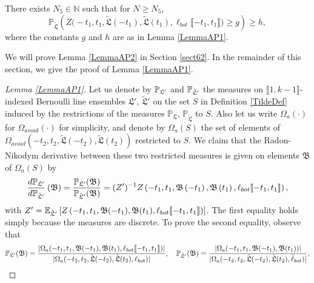 \begin{lemma}\label{LemmaAP2} There exists $N_5 \in \mathbb{N}$ such that for $N \geq N_5$,
	\begin{equation}\label{eqn57}
	\mathbb{P}_{\tilde{\mathfrak{L}}} \left( Z\big(  -t_1, t_1, \tilde{\mathfrak{L}}(-t_1) , \tilde{\mathfrak{L}}(t_1), \ell_{bot}\llbracket -t_1, t_1\rrbracket\big)\geq g    \right) \geq h,
	\end{equation}
	where the constants $g$ and $h$ are as in Lemma \ref{LemmaAP1}.
\end{lemma}
We will prove Lemma \ref{LemmaAP2} in Section \ref{sect62}. In the remainder of this section, we give the proof of Lemma \ref{LemmaAP1}.
\begin{proof}[Lemma \ref{LemmaAP1}]
	
	 Let us denote by $\mathbb{P}_{\mathfrak L'}$ and $\mathbb{P}_{\tilde{\mathfrak{L}}'}$ the measures on $\llbracket 1, k-1\rrbracket$-indexed Bernoulli line ensembles $\mathfrak{L}'$, $\tilde{\mathfrak{L}}'$ on the set $S$ in Definition \ref{TildeDef} induced by the restrictions of the measures $\mathbb{P}_{\mathfrak{L}}$, $\mathbb{P}_{\tilde{\mathfrak{L}}}$ to $S$. Also let us write $\Omega_a(\cdot)$ for $\Omega_{avoid}(\cdot)$ for simplicity, and denote by $\Omega_a(S)$ the set of elements of $\Omega_{avoid}(-t_2,t_2,\tilde{\mathfrak{L}}(-t_2),\tilde{\mathfrak{L}}(t_2))$ restricted to $S$. We claim that the Radon-Nikodym derivative between these two restricted measures is given on elements $\mathfrak B$ of $\Omega_a(S)$ by \begin{equation}\label{propRadon}
	\frac{d\mathbb{P}_{\mathfrak L'}}{d\mathbb{P}_{\tilde{\mathfrak L}'}}\left(\mathfrak B\right) = \frac{\mathbb{P}_{\mathfrak{L}'}(\mathfrak{B})}{\mathbb{P}_{\tilde{\mathfrak{L}}'}(\mathfrak{B})} = (Z')^{-1} Z\left(-t_1,t_1,\mathfrak{B}\left(-t_1\right),\mathfrak{B}\left(t_1\right),\ell_{bot}\llbracket -t_1,t_1\rrbracket\right),
	\end{equation}
	with $Z' = \mathbb{E}_{\tilde{\mathfrak{L}}'}\left[Z\left(-t_1, t_1, \mathfrak B(-t_1), \mathfrak B(t_1), \ell_{bot}\llbracket -t_1, t_1\rrbracket\right)\right]$. The first equality holds simply because the measures are discrete. To prove the second equality, observe that
	\[
	\mathbb{P}_{\mathfrak{L}'}(\mathfrak{B}) = \frac{|\Omega_a(-t_1,t_1,\mathfrak{B}(-t_1),\mathfrak{B}(t_1),\ell_{bot}\llbracket -t_1,t_1\rrbracket)|}{|\Omega_a(-t_2,t_2,\tilde{\mathfrak{L}}(-t_2),\tilde{\mathfrak{L}}(t_2),\ell_{bot})|}, 
	\quad
	\mathbb{P}_{\tilde{\mathfrak{L}}'}(\mathfrak{B}) = \frac{|\Omega_a(-t_1,t_1,\mathfrak{B}(-t_1),\mathfrak{B}(t_1))|}{|\Omega_a(-t_2,t_2,\tilde{\mathfrak{L}}(-t_2),\tilde{\mathfrak{L}}(t_2),\tilde\ell_{bot})|},
\]
\end{proof}

